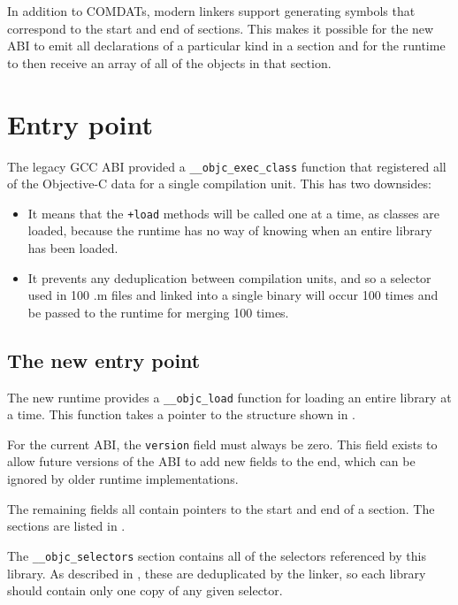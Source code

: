 \documentclass[a4paper]{report}
\newcommand{\file}[1]{\textsf{#1}}
\newcommand{\ccode}[1]{\lstinline[language={C}]{#1}}
\newcommand{\objc}[1]{\lstinline[language={[Objective]C}]{#1}}
\newcommand{\inccode}[4]{
	 }}
	]{../#1}
}
\begin{document}
In addition to COMDATs, modern linkers support generating symbols that correspond to the start and end of sections.
This makes it possible for the new ABI to emit all declarations of a particular kind in a section and for the runtime to then receive an array of all of the objects in that section.

\chapter{Entry point}

The legacy GCC ABI provided a \ccode{__objc_exec_class} function that registered all of the Objective-C data for a single compilation unit.
This has two downsides:

\begin{itemize}
	\item It means that the \objc{+load} methods will be called one at a time, as classes are loaded, because the runtime has no way of knowing when an entire library has been loaded.
	\item It prevents any deduplication between compilation units, and so a selector used in 100 \file{.m} files and linked into a single binary will occur 100 times and be passed to the runtime for merging 100 times.
\end{itemize}

\section{The new entry point}

The new runtime provides a \ccode{__objc_load} function for loading an entire library at a time.
This function takes a pointer to the structure shown in .

For the current ABI, the \ccode{version} field must always be zero.
This field exists to allow future versions of the ABI to add new fields to the end, which can be ignored by older runtime implementations.

The remaining fields all contain pointers to the start and end of a section.
The sections are listed in .

\inccode{loader.c}{initobjc}{objc_init}{The Objective-C library description structure.}

The \ccode{__objc_selectors} section contains all of the selectors referenced by this library.
As described in , these are deduplicated by the linker, so each library should contain only one copy of any given selector.
\end{document}
